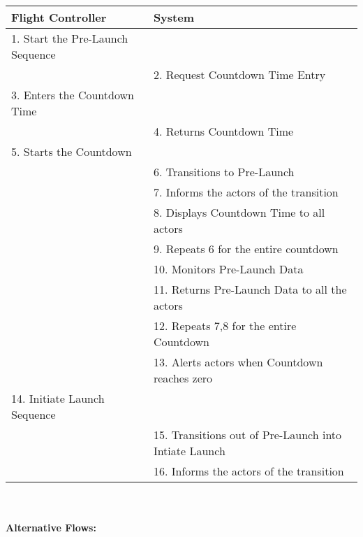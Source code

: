 \documentclass[letterpaper]{article}
\begin{document}
\begin{tabular}{|p{5.75cm}|p{5.75cm}|}\hline
\textbf{Flight Controller} & \textbf{System}\\\hline
1.  Start the Pre-Launch Sequence & \\\hline
& 2. Request Countdown Time Entry\\\hline
3.  Enters the Countdown Time & \\\hline
& 4.  Returns Countdown Time\\\hline
5.  Starts the Countdown  & \\\hline
& 6.  Transitions to Pre-Launch\\\hline
& 7.  Informs the actors of the transition\\\hline
& 8.  Displays Countdown Time to all actors\\\hline
& 9.  Repeats 6 for the entire countdown\\\hline
& 10.  Monitors Pre-Launch Data\\\hline
& 11. Returns Pre-Launch Data to all the actors\\\hline
& 12.  Repeats 7,8 for the entire Countdown\\\hline
& 13.  Alerts actors when Countdown reaches zero\\\hline
14.  Initiate Launch Sequence & \\\hline
& 15.  Transitions out of Pre-Launch into Intiate Launch\\\hline
& 16.  Informs the actors of the transition\\\hline
\end{tabular}\\\\
\textbf{Alternative Flows:  }
\end{document}
